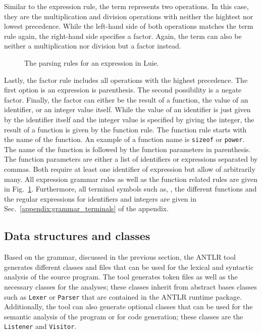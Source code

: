 Similar to the expression rule, the term represents two operations. In this case, they are the multiplication and division operations with neither the hightest nor lowest precedence. While the left-hand side of both operations matches the term rule again, the right-hand side specifies a factor. Again, the term can also be neither a multiplication nor division but a factor instead.

\begin{figure}[htp]
    \centering
    
    \caption{The parsing rules for an expression in Luie.}
    \label{fig:implementation_expression}
\end{figure}

Lastly, the factor rule includes all operations with the highest precedence. The first option is an expression is parenthesis. 
The second possibility is a negate factor. Finally, the factor can either be the result of a function, the value of an identifier, or an integer value itself. While the value of an identifier is just given by the identifier itself and the integer value is specified by giving the integer, the result of a function is given by the function rule. The function rule starts with the name of the function. An example of a function name is \texttt{sizeof} or \texttt{power}. The name of the function is followed by the function parameters in parenthesis. The function parameters are either a list of identifiers or expressions separated by commas. Both require at least one identifier of expression but allow of arbitrarily many. 
All expression grammar rules as well as the function related rules are given in Fig.~\ref{fig:implementation_expression}. Furthermore, all terminal symbols such as, \eg, the different functions and the regular expressions for identifiers and integers are given in Sec.~\ref{appendix:grammar_terminals} of the appendix.

\subsection{Data structures and classes}
\label{sec:implementation_syntax_dataStructuresClasses}
Based on the grammar, discussed in the previous section, the ANTLR tool generates different classes and files that can be used for the lexical and syntactic analysis of the source program. The tool generates token files as well as the necessary classes for the analyses; these classes inherit from abstract bases classes such as \texttt{Lexer} or \texttt{Parser} that are contained in the ANTLR runtime package. Additionally, the tool can also generate optional classes that can be used for the semantic analysis of the program or for code generation; these classes are the \texttt{Listener} and \texttt{Visitor}.

